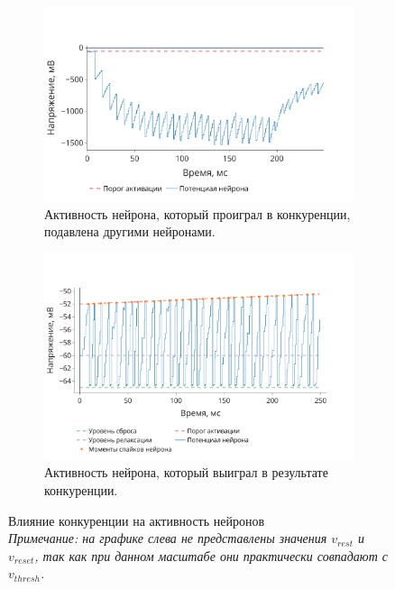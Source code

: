 \documentclass[a4paper]{article}
\begin{document}
\begin{figure}[H]
\centering
\begin{subfigure}{0.45\textwidth}
    \includegraphics[width=\textwidth,keepaspectratio=true]{bad_voltage_ru.pdf}
    \caption{Активность нейрона, который проиграл в конкуренции, подавлена другими нейронами.
    } 
\end{subfigure}
\begin{subfigure}{0.45\textwidth}
    \includegraphics[width=\textwidth,keepaspectratio=true]{good_voltage_ru.pdf}
    \caption{Активность нейрона, который выиграл в результате конкуренции.}
\end{subfigure}
\caption{Влияние конкуренции на активность нейронов\\
\textit{Примечание: на графике слева не представлены значения $v_{rest}$ и $v_{reset}$, так как при данном масштабе они практически совпадают с $v_{thresh}$.}}
\label{competition-training-importance}
\end{figure}
\end{document}
